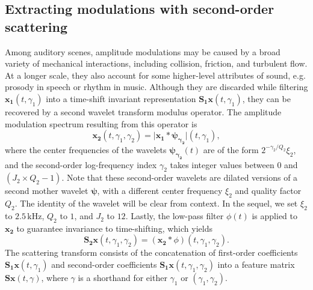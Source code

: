 \documentclass[journal]{IEEEtran}
\makeatletter
\newcommand*{\eg}{e.g.\@\xspace}
\makeatother
\begin{document}
\subsection{Extracting modulations with second-order scattering}
Among auditory scenes, amplitude modulations may be caused by a broad variety of mechanical interactions, including collision, friction, and turbulent flow.
At a longer scale, they also account for some higher-level attributes of sound, \eg prosody in speech or rhythm in music.
Although they are discarded while filtering $\boldsymbol{x_1}(t,\gamma_1)$ into a time-shift invariant representation $\mathbf{S_1}\boldsymbol{x}(t,\gamma_1)$, they can be recovered by a second wavelet transform modulus operator.
The amplitude modulation spectrum resulting from this operator is
\begin{equation}
\boldsymbol{x_2}(t,\gamma_1,\gamma_2) =
\vert \boldsymbol{x_1} \ast \boldsymbol{\psi_{\gamma_2}} \vert(t,\gamma_1),
\end{equation}
where the center frequencies of the wavelets $\boldsymbol{\psi_{\gamma_2}}(t)$ are of the form $2^{-\gamma_2/Q_2} \xi_2$, and the second-order log-frequency index $\gamma_2$ takes integer values between $0$ and $(J_2 \times Q_2 - 1)$. Note that these second-order wavelets are dilated versions of a second mother wavelet $\boldsymbol{\psi}$, with a different center frequency $\xi_2$ and quality factor $Q_2$. The identity of the wavelet will be clear from context.
In the sequel, we set $\xi_2$ to $2.5\,\mathrm{kHz}$, $Q_2$ to $1$, and $J_2$ to $12$. Lastly, the low-pass filter $\phi(t)$ is applied to $\boldsymbol{x_2}$ to guarantee invariance to time-shifting, which yields
\begin{equation}
\mathbf{S_2}\boldsymbol{x}(t,\gamma_1,\gamma_2) =
(\boldsymbol{x_2} \ast \phi)(t,\gamma_1,\gamma_2).
\end{equation}
The scattering transform consists of the concatenation of first-order coefficients $\mathbf{S_1}\boldsymbol{x}(t,\gamma_1)$ and second-order coefficients $\mathbf{S_1}\boldsymbol{x}(t,\gamma_1,\gamma_2)$ into a feature matrix $\mathbf{S}\boldsymbol{x}(t,\gamma)$, where $\gamma$ is a shorthand for either $\gamma_1$ or $(\gamma_1,\gamma_2)$.
\end{document}
